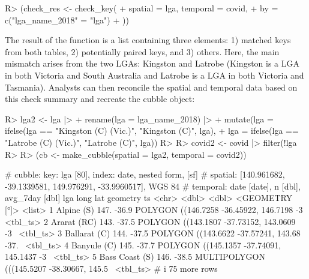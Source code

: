 \documentclass[
  shortnames]{jss}
\begin{document}
\begin{CodeChunk}
\begin{CodeInput}
R> (check_res <- check_key(
+   spatial = lga, temporal = covid, 
+   by = c("lga_name_2018" = "lga")
+ ))
\end{CodeInput}
\end{CodeChunk}

The result of the  function is a list containing three elements: 1) matched keys from both tables, 2) potentially paired keys, and 3) others. Here, the main mismatch arises from the two LGAs: Kingston and Latrobe (Kingston is a LGA in both Victoria and South Australia and Latrobe is a LGA in both Victoria and Tasmania). Analysts can then reconcile the spatial and temporal data based on this check summary and recreate the cubble object:

\begin{CodeChunk}
\begin{CodeInput}
R> lga2 <- lga |>
+   rename(lga = lga_name_2018) |> 
+   mutate(lga = ifelse(lga == "Kingston (C) (Vic.)", "Kingston (C)", lga),
+          lga = ifelse(lga == "Latrobe (C) (Vic.)", "Latrobe (C)", lga))
R>   
R> covid2 <- covid |> filter(!lga %
R> 
R> (cb <- make_cubble(spatial = lga2, temporal = covid2))
\end{CodeInput}
\begin{CodeOutput}
# cubble:   key: lga [80], index: date, nested form, [sf]
# spatial:  [140.961682, -39.1339581, 149.976291, -33.9960517], WGS 84
# temporal: date [date], n [dbl], avg_7day [dbl]
  lga             long   lat                                   geometry ts      
  <chr>          <dbl> <dbl>                             <GEOMETRY [°]> <list>  
1 Alpine (S)      147. -36.9 POLYGON ((146.7258 -36.45922, 146.7198 -3~ <tbl_ts>
2 Ararat (RC)     143. -37.5 POLYGON ((143.1807 -37.73152, 143.0609 -3~ <tbl_ts>
3 Ballarat (C)    144. -37.5 POLYGON ((143.6622 -37.57241, 143.68 -37.~ <tbl_ts>
4 Banyule (C)     145. -37.7 POLYGON ((145.1357 -37.74091, 145.1437 -3~ <tbl_ts>
5 Bass Coast (S)  146. -38.5 MULTIPOLYGON (((145.5207 -38.30667, 145.5~ <tbl_ts>
# i 75 more rows
\end{CodeOutput}
\end{CodeChunk}
\end{document}
